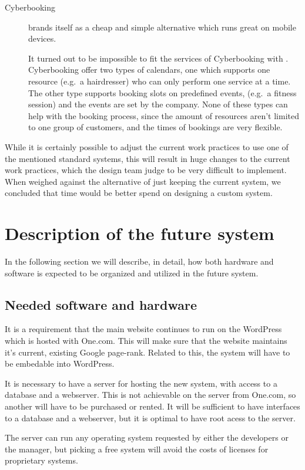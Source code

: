 \begin{description}
\item[Cyberbooking] brands itself as a cheap and simple alternative which runs great 
on mobile devices. 

It turned out to be impossible to fit the services of Cyberbooking with \gomonkey{}. 
Cyberbooking offer two types of 
calendars, one which supports one resource (e.g.\ a hairdresser) who can only
perform one service at a time. The other type supports booking slots on 
predefined events, (e.g.\ a fitness session) and the events are set by the 
company. None of these types can help \gomonkey{} with the booking process,
since the amount of resources aren't limited to one group of customers, and 
the times of bookings are very flexible.
\end{description}

While it is certainly possible to adjust the current work practices to use one of the
mentioned standard systems, this will result in huge changes to the current work
practices, which the design team judge to be very difficult to implement. When weighed
against the alternative of just keeping the current system, we concluded that time would 
be better spend on designing a custom system.


\newpage
\section{Description of the future system}
In the following section we will describe, in detail, how both hardware and
software is expected to be organized and utilized in the future system.

\subsection{Needed software and hardware}
It is a requirement that the main website continues to run on the 
WordPress which is hosted with One.com. This will make
sure that the website maintains it's current, existing Google page-rank. Related 
to this, the system will have to be embedable into WordPress. 

It is necessary to have a server for hosting the new system, with 
access to a database and a webserver. This is not achievable on the server from 
One.com, so another will have to be purchased or rented. It will be sufficient to have 
interfaces to a database and a webserver, but it is optimal to have root acess
to the server.

The server can run any operating system requested by either the developers or
the manager, but picking a free system will avoid the costs of licenses for 
proprietary systems.

